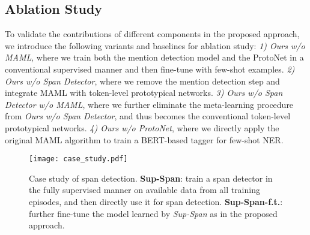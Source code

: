 \documentclass[11pt]{article}
\begin{document}
\subsection{Ablation Study}
To validate the contributions of different components in the proposed approach, we introduce the following variants and baselines for ablation study:
\textit{1) Ours w/o MAML}, where we train both the mention detection model and the ProtoNet in a conventional supervised manner and then fine-tune with few-shot examples.
\textit{2) Ours w/o Span Detector}, where we remove the mention detection step and integrate MAML with token-level prototypical networks.
\textit{3) Ours w/o Span Detector w/o MAML}, where we further eliminate the meta-learning procedure from \textit{Ours w/o Span Detector}, and thus becomes the conventional token-level prototypical networks.
\textit{4) Ours w/o ProtoNet}, where we directly apply the original MAML algorithm to train a BERT-based tagger for few-shot NER.
\begin{table}[htb]
    \centering
    \caption{Ablation study: F1 scores on Few-NERD 5-way 12-shot are reported.}
    \label{tab:ablation}
\end{table}






\begin{figure*}[t]
    \centering
    \texttt{[image: case\_study.pdf]}
    \caption{Case study of span detection. \textbf{Sup-Span}: train a span detector in the fully supervised manner on available data from all training episodes, and then directly use it for span detection. \textbf{Sup-Span-f.t.}: further fine-tune the model learned by \textit{Sup-Span} as in the proposed approach.}
    \label{fig:case_study}
\end{figure*}
\end{document}
